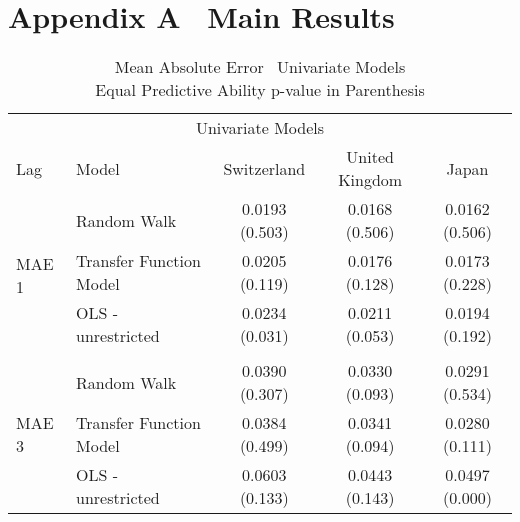 
\section*{Appendix A \textendash \ Main Results}

\vspace{10em}

\begin{table}[!ht] %
  \centering
  \caption{Mean Absolute Error \textendash \ Univariate Models \\
           Equal Predictive Ability p-value in Parenthesis}
  \begin{tabular}{llccc} %
    \toprule
    \multicolumn{5}{c}{Univariate Models}                      \\
    \cmidrule(r){1-5}
    Lag                           &   Model                                     &Switzerland  & United Kingdom  & Japan\\
    \midrule
    \multirow{4}{*}{MAE 1}        & \multicolumn{1}{l}{Random Walk}             &   0.0193 (0.503) & 0.0168 (0.506) & 0.0162 (0.506)\\
                                  & \multicolumn{1}{l}{Transfer Function Model} &   0.0205 (0.119) & 0.0176 (0.128) & 0.0173 (0.228)\\ 
                                  & \multicolumn{1}{l}{OLS - unrestricted}      &   0.0234 (0.031) & 0.0211 (0.053) & 0.0194 (0.192)\\
    \\
    \multirow{4}{*}{MAE 3}        & \multicolumn{1}{l}{Random Walk}             &   0.0390 (0.307) & 0.0330 (0.093) & 0.0291 (0.534)\\ 
                                  & \multicolumn{1}{l}{Transfer Function Model} &   0.0384 (0.499) & 0.0341 (0.094) & 0.0280 (0.111)\\
                                  & \multicolumn{1}{l}{OLS - unrestricted}      &   0.0603 (0.133) & 0.0443 (0.143) & 0.0497 (0.000)\\
                                                                             

\end{tabular}
\end{table}
